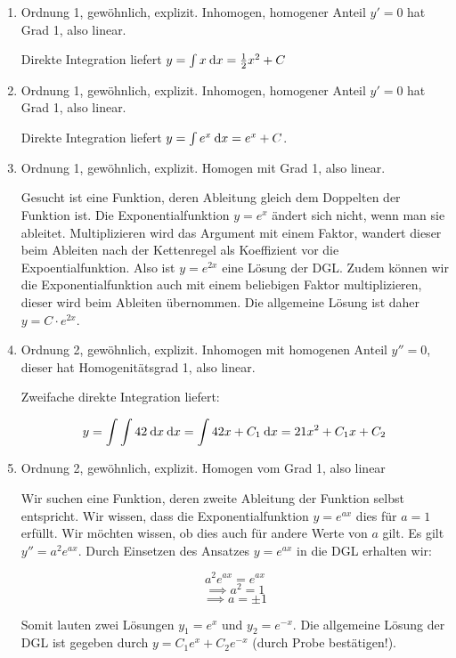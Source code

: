 \item

\begin{enumerate}
\item Ordnung 1, gewöhnlich, explizit. Inhomogen, homogener Anteil $y'=0$ hat Grad 1, also linear.

Direkte Integration liefert $y = \int x \:\mathrm{d}{x} = \frac{1}{2}x^2+C$

\item Ordnung 1, gewöhnlich, explizit. Inhomogen, homogener Anteil $y'=0$ hat Grad 1, also linear.

Direkte Integration liefert $y = \int e^x \:\mathrm{d}{x} = e^x + C$.

\item Ordnung 1, gewöhnlich, explizit. Homogen mit Grad 1, also linear.

Gesucht ist eine Funktion, deren Ableitung gleich dem Doppelten der Funktion ist. Die Exponentialfunktion $y = e^x$ ändert sich nicht, wenn man sie ableitet. Multiplizieren wird das Argument mit einem Faktor, wandert dieser beim Ableiten nach der Kettenregel als Koeffizient vor die Expoentialfunktion. Also ist $y = e^{2x}$ eine Lösung der DGL. Zudem können wir die Exponentialfunktion auch mit einem beliebigen Faktor multiplizieren, dieser wird beim Ableiten übernommen. Die allgemeine Lösung ist daher $y = C\cdot e^{2x}$.

\item Ordnung 2, gewöhnlich, explizit. Inhomogen mit homogenen Anteil $y''=0$, dieser hat Homogenitätsgrad 1, also linear.

Zweifache direkte Integration liefert:

$$y = \int \int 42 \:\mathrm{d}{x} \:\mathrm{d}{x} = \int 42x +C_1 \:\mathrm{d}{x} = 21x^2 + C_1 x + C_2$$

\item Ordnung 2, gewöhnlich, explizit. Homogen vom Grad 1, also linear

Wir suchen eine Funktion, deren zweite Ableitung der Funktion selbst entspricht. Wir wissen, dass die Exponentialfunktion $y=e^{ax}$  dies für $a=1$ erfüllt. Wir möchten wissen, ob dies auch für andere Werte von $a$ gilt. Es gilt $y'' = a^2 e^{ax}$. Durch Einsetzen des Ansatzes $y=e^{ax}$ in die DGL erhalten wir:

$$a^2 e^{ax} = e^{ax}$$
$$\implies a^2 = 1$$
$$\implies a = \pm 1$$

Somit lauten zwei Lösungen $y_1 = e^x$ und $y_2 = e^{-x}$. Die allgemeine Lösung der DGL ist gegeben durch $y = C_1 e^x + C_2 e^{-x}$ (durch Probe bestätigen!).


\end{enumerate}
